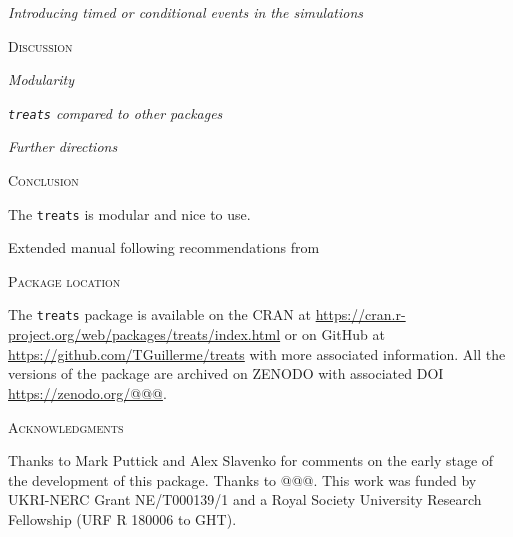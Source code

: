 \documentclass[12pt,letterpaper]{article}
\renewcommand{\section}[1]{%
\bigskip
\begin{center}
\begin{Large}
\normalfont\scshape #1
\medskip
\end{Large}
\end{center}}
\renewcommand{\subsection}[1]{%
\bigskip
\begin{center}
\begin{large}
\normalfont\itshape #1
\end{large}
\end{center}}
\newcommand{\treats}{\texttt{treats} }
\begin{document}

\subsection{Introducing timed or conditional events in the simulations}


\section{Discussion}

\subsection{Modularity}

\subsection{\treats compared to other packages}

\subsection{Further directions}


\section{Conclusion}
The \treats is modular and nice to use.

Extended manual following recommendations from \cite{cooper2016dark}


\section{Package location}
The \treats package is available on the CRAN at \url{https://cran.r-project.org/web/packages/treats/index.html} or on GitHub at \url{https://github.com/TGuillerme/treats} with more associated information.
All the versions of the package are archived on ZENODO with associated DOI \url{https://zenodo.org/@@@}.

\section{Acknowledgments}
Thanks to Mark Puttick and Alex Slavenko for comments on the early stage of the development of this package. Thanks to @@@. This work was funded by UKRI-NERC Grant NE/T000139/1 and a Royal Society University Research Fellowship (URF R 180006 to GHT).



\end{document}
